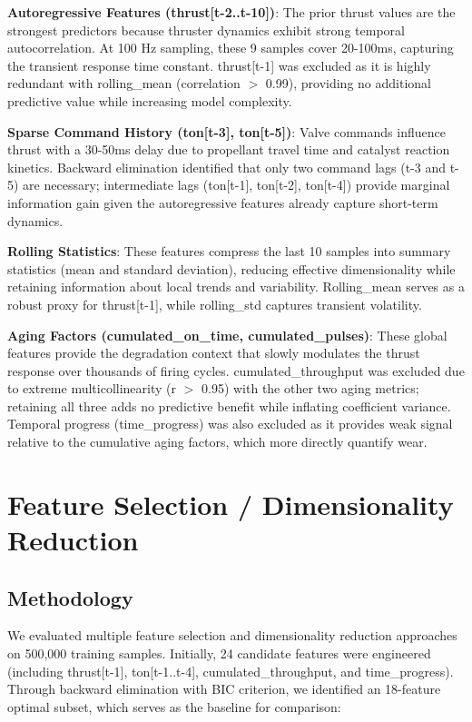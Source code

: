 \documentclass[12pt,a4paper]{article}
\begin{document}
\textbf{Autoregressive Features (thrust[t-2..t-10])}: The prior thrust values are the strongest predictors because thruster dynamics exhibit strong temporal autocorrelation. At 100 Hz sampling, these 9 samples cover 20-100ms, capturing the transient response time constant. thrust[t-1] was excluded as it is highly redundant with rolling\_mean (correlation $>$ 0.99), providing no additional predictive value while increasing model complexity.

\textbf{Sparse Command History (ton[t-3], ton[t-5])}: Valve commands influence thrust with a 30-50ms delay due to propellant travel time and catalyst reaction kinetics. Backward elimination identified that only two command lags (t-3 and t-5) are necessary; intermediate lags (ton[t-1], ton[t-2], ton[t-4]) provide marginal information gain given the autoregressive features already capture short-term dynamics.

\textbf{Rolling Statistics}: These features compress the last 10 samples into summary statistics (mean and standard deviation), reducing effective dimensionality while retaining information about local trends and variability. Rolling\_mean serves as a robust proxy for thrust[t-1], while rolling\_std captures transient volatility.

\textbf{Aging Factors (cumulated\_on\_time, cumulated\_pulses)}: These global features provide the degradation context that slowly modulates the thrust response over thousands of firing cycles. cumulated\_throughput was excluded due to extreme multicollinearity (r $>$ 0.95) with the other two aging metrics; retaining all three adds no predictive benefit while inflating coefficient variance. Temporal progress (time\_progress) was also excluded as it provides weak signal relative to the cumulative aging factors, which more directly quantify wear.

\section{Feature Selection / Dimensionality Reduction}

\subsection{Methodology}

We evaluated multiple feature selection and dimensionality reduction approaches on 500,000 training samples. Initially, 24 candidate features were engineered (including thrust[t-1], ton[t-1..t-4], cumulated\_throughput, and time\_progress). Through backward elimination with BIC criterion, we identified an 18-feature optimal subset, which serves as the baseline for comparison:
\end{document}
